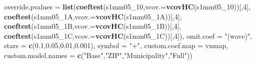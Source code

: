 \documentclass[
]{article}
\newenvironment{Shaded}{\begin{snugshade}}{\end{snugshade}}
\newcommand{\DataTypeTok}[1]{\textcolor[rgb]{0.13,0.29,0.53}{#1}}
\newcommand{\DecValTok}[1]{\textcolor[rgb]{0.00,0.00,0.81}{#1}}
\newcommand{\FloatTok}[1]{\textcolor[rgb]{0.00,0.00,0.81}{#1}}
\newcommand{\KeywordTok}[1]{\textcolor[rgb]{0.13,0.29,0.53}{\textbf{#1}}}
\newcommand{\NormalTok}[1]{#1}
\newcommand{\StringTok}[1]{\textcolor[rgb]{0.31,0.60,0.02}{#1}}
\begin{document}
\begin{Shaded}
\begin{Highlighting}[]
          \DataTypeTok{override.pvalues =} \KeywordTok{list}\NormalTok{(}\KeywordTok{coeftest}\NormalTok{(s1mm05_}\DecValTok{10}\NormalTok{,}\DataTypeTok{vcov.=}\KeywordTok{vcovHC}\NormalTok{(s1mm05_}\DecValTok{10}\NormalTok{))[,}\DecValTok{4}\NormalTok{],}
                                  \KeywordTok{coeftest}\NormalTok{(s1mm05_1A,}\DataTypeTok{vcov.=}\KeywordTok{vcovHC}\NormalTok{(s1mm05_1A))[,}\DecValTok{4}\NormalTok{],}
                                  \KeywordTok{coeftest}\NormalTok{(s1mm05_1B,}\DataTypeTok{vcov.=}\KeywordTok{vcovHC}\NormalTok{(s1mm05_1B))[,}\DecValTok{4}\NormalTok{],}
                                  \KeywordTok{coeftest}\NormalTok{(s1mm05_1C,}\DataTypeTok{vcov.=}\KeywordTok{vcovHC}\NormalTok{(s1mm05_1C))[,}\DecValTok{4}\NormalTok{]),}
          \DataTypeTok{omit.coef =} \StringTok{"(wave)"}\NormalTok{, }\DataTypeTok{stars =} \KeywordTok{c}\NormalTok{(}\FloatTok{0.1}\NormalTok{,}\FloatTok{0.05}\NormalTok{,}\FloatTok{0.01}\NormalTok{,}\FloatTok{0.001}\NormalTok{), }\DataTypeTok{symbol =} \StringTok{"+"}\NormalTok{,}
          \DataTypeTok{custom.coef.map =}\NormalTok{ vnmap, }
          \DataTypeTok{custom.model.names =} \KeywordTok{c}\NormalTok{(}\StringTok{"Base"}\NormalTok{,}\StringTok{"ZIP"}\NormalTok{,}\StringTok{"Municipality"}\NormalTok{,}\StringTok{"Full"}\NormalTok{))}
\end{Highlighting}
\end{Shaded}
\end{document}
